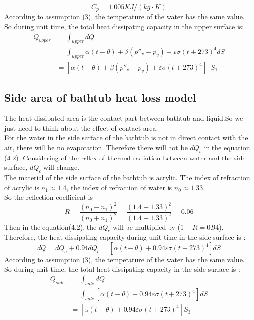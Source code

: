 \documentclass{mcmthesis}
\begin{document}
\begin{equation}
C_{p}=1.005KJ/(kg\cdot K)
\end{equation}
\indent According to assumption (3), the temperature of the water has the same value. So during unit time, the total heat dissipating capacity in the upper surface is:\\
\begin{equation}\label{bubble}
\begin{split}
Q_{upper}&=\int_{upper} dQ\\
&= \int_{upper}\alpha (t-\theta)+\beta ({p}''_{v}-p_{v})+\varepsilon \sigma (t+273)^{4}dS	\\
&=[\alpha (t-\theta)+\beta ({p}''_{v}-p_{v})+\varepsilon \sigma (t+273)^{4}]\cdot S_{1}\
\end{split}
\end{equation}

\subsection{Side area of bathtub heat loss model} 	%
\indent The heat dissipated area is the contact part between bathtub and liquid.So we just need to think about the effect of contact area. \\ \indent For the water in the side surface of the bathtub is not in direct contact with the air, there will be no evaporation. Therefore there will not be $ dQ_{b} $ in the equation (4.2). Considering of the reflex of thermal radiation between water and the side surface, $dQ_{c}$ will change.\\ \indent The material of the side surface of the bathtub is acrylic. The index of refraction of acrylic is $n_{1}\approx 1.4$, the index of refraction of water is $ n_{0}\approx 1.33 $.\\ \indent So the reflection coefficient is 
\begin{equation}
	 R=\frac{(n_{0}-n_{1})^{2}}{(n_{0}+n_{1})^{2}}=\frac{(1.4-1.33)^{2}}{(1.4+1.33)^2}=0.06 
\end{equation}
\indent Then in the equation(4.2),  the $dQ_{c}$ will be multiplied by ($1-R=0.94$).  Therefore, the heat dissipating capacity during unit time in the side surface is :
\begin{equation}
	dQ=dQ_{a}+0.94dQ_{c}=[\alpha (t-\theta)+0.94\varepsilon \sigma (t+273)^{4}]dS
\end{equation}
\indent According to assumption (3), the temperature of the water has the same value. So during unit time, the total heat dissipating capacity in the side surface is :				%
\begin{equation}
\begin{split}
Q_{side}&=\int_{side}dQ\\
&= \int_{side} [\alpha (t-\theta)+0.94\varepsilon \sigma (t+273)^{4}]dS	\\
&=[\alpha (t-\theta)+0.94\varepsilon \sigma (t+273)^{4}]S_{3}\\
\end{split}
\end{equation}
\end{document}
